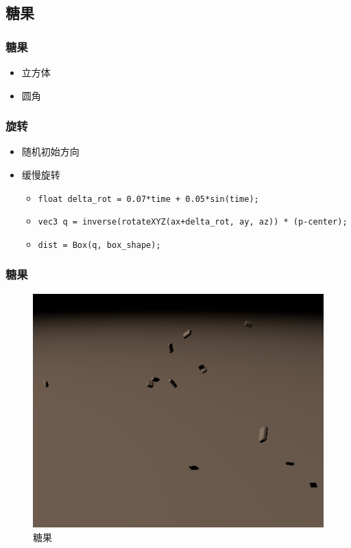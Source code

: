 \documentclass[aspectratio=169]{ctexbeamer} %
\begin{document}
\subsection{糖果}
\begin{frame}
    \frametitle{糖果}
    \begin{itemize}
        \item 立方体
        \item 圆角
    \end{itemize}
\end{frame}
\begin{frame}
    \frametitle{旋转}
    \begin{itemize}
        \item 随机初始方向
        \item 缓慢旋转
        \begin{itemize}
            \item \texttt{float delta\_rot = 0.07*time + 0.05*sin(time);}
            \item \texttt{vec3 q = inverse(rotateXYZ(ax+delta\_rot, ay, az)) * (p-center);}
            \item \texttt{dist = Box(q, box\_shape);}
        \end{itemize}
    \end{itemize}
\end{frame}
\begin{frame}
    \frametitle{糖果}
    \begin{figure}[htbp]
        \centering
        \includegraphics[height=.75\textheight]{images/pre/candies.pdf}
        \caption{糖果}
        \label{fig:candies}
    \end{figure}
\end{frame}
\end{document}
